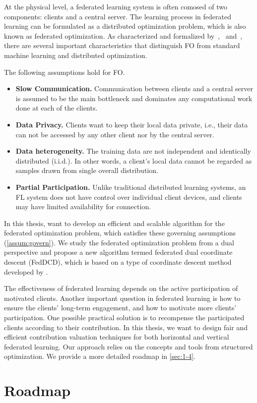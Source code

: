 At the physical level, a federated learning system is often comosed of two components: clients and a central server. The learning process in federated learning can be formulated as a distributed optimization problem, which is also known as federated optimization. As characterized and formalized by~\citet{wang2021field},~\citet{li2020federated} and~\citet{li2019convergence}, there are several important characteristics that distinguish FO from standard machine learning and distributed optimization. 
\begin{assumption} \label{assum:govern}
The following assumptions hold for FO. 
  \begin{itemize}
    \item \textbf{Slow Communication.}  Communication between clients and a central server is assumed to be the main bottleneck and dominates any computational work done at each of the clients. 
    \item \textbf{Data Privacy.} Clients want to keep their local data private, i.e., their data can not be accessed by any other client nor by the central server.
    \item \textbf{Data heterogeneity.} The training data are not independent and identically distributed (i.i.d.). In other words, a client’s local data cannot be regarded as samples drawn from single overall distribution.
    \item \textbf{Partial Participation.} Unlike traditional distributed learning systems, an FL system does not have control over individual client devices, and clients may have limited availability for connection. 
\end{itemize}
\end{assumption}

In this thesis, want to develop an efficient and scalable algorithm for the federated optimization problem, which satisfies these governing assumptions (\autoref{assum:govern}). We study the federated optimization problem from a dual perspective and propose a new algorithm termed federated dual coordinate descent (FedDCD), which is based on a type of coordinate descent method developed by \citet{necoara2017random}. 

The effectiveness of federated learning depends on the active participation of motivated clients. Another important question in federated learning is how to ensure the clients’ long-term engagement, and how to motivate more clients' participation. One possible practical solution is to recompense the participated clients according to their contribution. In this thesis, we want to design fair and efficient contribution valuation techniques for both horizontal and vertical federated learning. Our approach relies on the concepts and tools from structured optimization. We provide a more detailed roadmap in \autoref{sec:1-4}. 



\section{Roadmap} \label{sec:1-5}


